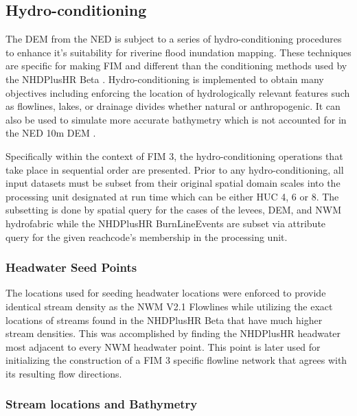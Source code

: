 \subsection{Hydro-conditioning}

The DEM from the NED is subject to a series of hydro-conditioning procedures to enhance it's suitability for riverine flood inundation mapping. 
These techniques are specific for making FIM and different than the conditioning methods used by the NHDPlusHR Beta \cite{moore2019user}.
Hydro-conditioning is implemented to obtain many objectives including enforcing the location of hydrologically relevant features such as flowlines, lakes, or drainage divides whether natural or anthropogenic. 
It can also be used to simulate more accurate bathymetry which is not accounted for in the NED 10m DEM \cite{gesch2002national}.

Specifically within the context of FIM 3, the hydro-conditioning operations that take place in sequential order are presented.
Prior to any hydro-conditioning, all input datasets must be subset from their original spatial domain scales into the processing unit designated at run time which can be either HUC 4, 6 or 8. 
The subsetting is done by spatial query for the cases of the levees, DEM, and NWM hydrofabric while the NHDPlusHR BurnLineEvents are subset via attribute query for the given reachcode's membership in the processing unit.

\subsubsection{Headwater Seed Points} 

The locations used for seeding headwater locations were enforced to provide identical stream density as the NWM V2.1 Flowlines while utilizing the exact locations of streams found in the NHDPlusHR Beta that have much higher stream densities. 
This was accomplished by finding the NHDPlusHR headwater most adjacent to every NWM headwater point. 
This point is later used for initializing the construction of a FIM 3 specific flowline network that agrees with its resulting flow directions.

\subsubsection{Stream locations and Bathymetry}

